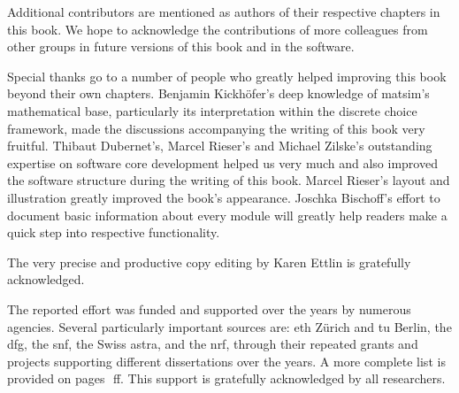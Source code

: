 % 
Additional contributors are mentioned as authors of their respective chapters in this book.  We hope to acknowledge the contributions of more colleagues from other groups in future versions of this book and in the software.   



Special thanks go to a number of people who greatly helped improving this book beyond their own chapters.
Benjamin Kickhöfer's deep knowledge of \gls{matsim}'s mathematical base, particularly its interpretation within the discrete choice framework, made the discussions accompanying the writing of this book very fruitful. 
Thibaut Dubernet's, Marcel Rieser's and Michael Zilske's outstanding expertise on software core development helped us very much and also improved the software structure during the writing of this book.
Marcel Rieser's layout and illustration greatly improved the book's appearance.
Joschka Bischoff's effort to document basic information about every module will greatly help readers make a quick step into respective functionality.

The very precise and productive copy editing by Karen Ettlin is gratefully acknowledged. %

The reported effort was funded and supported over the years by numerous agencies. Several particularly important sources are: \gls{eth} Zürich and \gls{tu} Berlin,
the \gls{dfg}, the \gls{snf}, the Swiss \gls{astra}, 
and the \gls{nrf}, through their repeated grants and projects supporting different dissertations over the years.  A more complete list is provided 
on pages~\pageref{ch:acks}\,ff.  This support is gratefully acknowledged by all researchers. 


